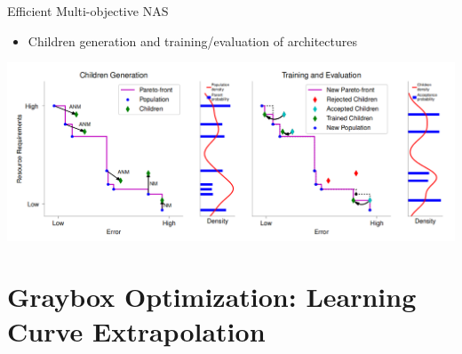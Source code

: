 \begin{frame}[c]{Efficient Multi-objective NAS }
\begin{itemize}
	\item Children generation and training/evaluation of architectures 
\end{itemize}

\begin{centering}
    \includegraphics[scale=0.27]{images_lec7/lemonade_2.png}
\end{centering}

	\pause

\end{frame}





\section{Graybox Optimization: Learning Curve Extrapolation}

